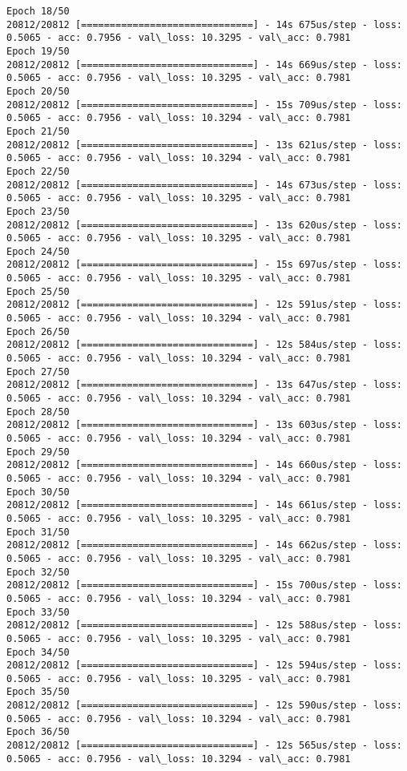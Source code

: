 \documentclass[11pt]{article}
\begin{document}
\begin{Verbatim}[commandchars=\\\{\}]
Epoch 18/50
20812/20812 [==============================] - 14s 675us/step - loss: 0.5065 - acc: 0.7956 - val\_loss: 10.3295 - val\_acc: 0.7981
Epoch 19/50
20812/20812 [==============================] - 14s 669us/step - loss: 0.5065 - acc: 0.7956 - val\_loss: 10.3295 - val\_acc: 0.7981
Epoch 20/50
20812/20812 [==============================] - 15s 709us/step - loss: 0.5065 - acc: 0.7956 - val\_loss: 10.3294 - val\_acc: 0.7981
Epoch 21/50
20812/20812 [==============================] - 13s 621us/step - loss: 0.5065 - acc: 0.7956 - val\_loss: 10.3294 - val\_acc: 0.7981
Epoch 22/50
20812/20812 [==============================] - 14s 673us/step - loss: 0.5065 - acc: 0.7956 - val\_loss: 10.3295 - val\_acc: 0.7981
Epoch 23/50
20812/20812 [==============================] - 13s 620us/step - loss: 0.5065 - acc: 0.7956 - val\_loss: 10.3295 - val\_acc: 0.7981
Epoch 24/50
20812/20812 [==============================] - 15s 697us/step - loss: 0.5065 - acc: 0.7956 - val\_loss: 10.3295 - val\_acc: 0.7981
Epoch 25/50
20812/20812 [==============================] - 12s 591us/step - loss: 0.5065 - acc: 0.7956 - val\_loss: 10.3294 - val\_acc: 0.7981
Epoch 26/50
20812/20812 [==============================] - 12s 584us/step - loss: 0.5065 - acc: 0.7956 - val\_loss: 10.3294 - val\_acc: 0.7981
Epoch 27/50
20812/20812 [==============================] - 13s 647us/step - loss: 0.5065 - acc: 0.7956 - val\_loss: 10.3294 - val\_acc: 0.7981
Epoch 28/50
20812/20812 [==============================] - 13s 603us/step - loss: 0.5065 - acc: 0.7956 - val\_loss: 10.3294 - val\_acc: 0.7981
Epoch 29/50
20812/20812 [==============================] - 14s 660us/step - loss: 0.5065 - acc: 0.7956 - val\_loss: 10.3294 - val\_acc: 0.7981
Epoch 30/50
20812/20812 [==============================] - 14s 661us/step - loss: 0.5065 - acc: 0.7956 - val\_loss: 10.3295 - val\_acc: 0.7981
Epoch 31/50
20812/20812 [==============================] - 14s 662us/step - loss: 0.5065 - acc: 0.7956 - val\_loss: 10.3295 - val\_acc: 0.7981
Epoch 32/50
20812/20812 [==============================] - 15s 700us/step - loss: 0.5065 - acc: 0.7956 - val\_loss: 10.3294 - val\_acc: 0.7981
Epoch 33/50
20812/20812 [==============================] - 12s 588us/step - loss: 0.5065 - acc: 0.7956 - val\_loss: 10.3295 - val\_acc: 0.7981
Epoch 34/50
20812/20812 [==============================] - 12s 594us/step - loss: 0.5065 - acc: 0.7956 - val\_loss: 10.3295 - val\_acc: 0.7981
Epoch 35/50
20812/20812 [==============================] - 12s 590us/step - loss: 0.5065 - acc: 0.7956 - val\_loss: 10.3294 - val\_acc: 0.7981
Epoch 36/50
20812/20812 [==============================] - 12s 565us/step - loss: 0.5065 - acc: 0.7956 - val\_loss: 10.3294 - val\_acc: 0.7981

\end{Verbatim}
\end{document}
